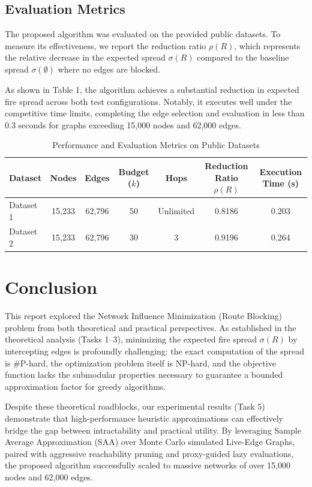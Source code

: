 \documentclass[11pt]{article}
\begin{document}
\subsection*{Evaluation Metrics}

The proposed algorithm was evaluated on the provided public datasets. To measure its effectiveness, we report the reduction ratio $\rho(R)$, which represents the relative decrease in the expected spread $\sigma(R)$ compared to the baseline spread $\sigma(\emptyset)$ where no edges are blocked. 

As shown in Table 1, the algorithm achieves a substantial reduction in expected fire spread across both test configurations. Notably, it executes well under the competitive time limits, completing the edge selection and evaluation in less than 0.3 seconds for graphs exceeding 15,000 nodes and 62,000 edges.

\begin{table}[h]
\centering
\begin{tabular}{|l|c|c|c|c|c|c|}
\hline
\textbf{Dataset} & \textbf{Nodes} & \textbf{Edges} & \textbf{Budget ($k$)} & \textbf{Hops} & \textbf{Reduction Ratio $\rho(R)$} & \textbf{Execution Time (s)} \\ \hline
Dataset 1 & 15,233 & 62,796 & 50 & Unlimited & 0.8186 & 0.203 \\ \hline
Dataset 2 & 15,233 & 62,796 & 30 & 3 & 0.9196 & 0.264 \\ \hline
\end{tabular}
\caption{Performance and Evaluation Metrics on Public Datasets}
\end{table}


\section*{Conclusion}

This report explored the Network Influence Minimization (Route Blocking) problem from both theoretical and practical perspectives. As established in the theoretical analysis (Tasks 1--3), minimizing the expected fire spread $\sigma(R)$ by intercepting edges is profoundly challenging: the exact computation of the spread is \#P-hard, the optimization problem itself is NP-hard, and the objective function lacks the submodular properties necessary to guarantee a bounded approximation factor for greedy algorithms. 

Despite these theoretical roadblocks, our experimental results (Task 5) demonstrate that high-performance heuristic approximations can effectively bridge the gap between intractability and practical utility. By leveraging Sample Average Approximation (SAA) over Monte Carlo simulated Live-Edge Graphs, paired with aggressive reachability pruning and proxy-guided lazy evaluations, the proposed algorithm successfully scaled to massive networks of over 15,000 nodes and 62,000 edges. 
\end{document}
